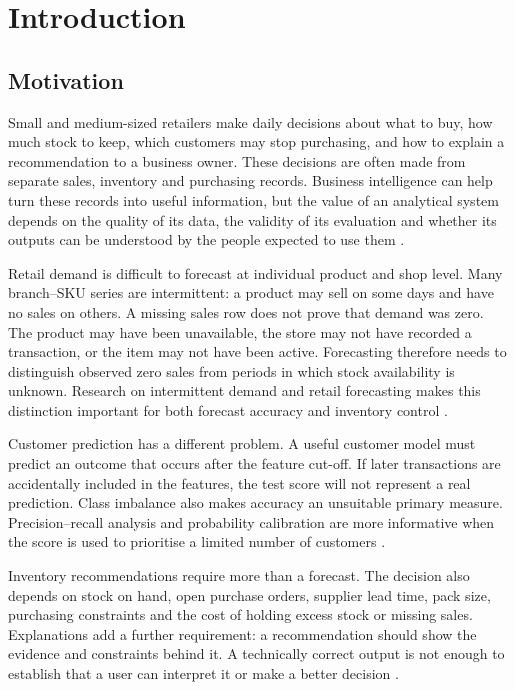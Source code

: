 \chapter{Introduction}
\label{chapter_introduction}

\section{Motivation}
Small and medium-sized retailers make daily decisions about what to buy, how much stock to keep, which customers may stop purchasing, and how to explain a recommendation to a business owner. These decisions are often made from separate sales, inventory and purchasing records. Business intelligence can help turn these records into useful information, but the value of an analytical system depends on the quality of its data, the validity of its evaluation and whether its outputs can be understood by the people expected to use them \citep{chen2012business,hoque2016ict,shahadat2023digital}.

Retail demand is difficult to forecast at individual product and shop level. Many branch--SKU series are intermittent: a product may sell on some days and have no sales on others. A missing sales row does not prove that demand was zero. The product may have been unavailable, the store may not have recorded a transaction, or the item may not have been active. Forecasting therefore needs to distinguish observed zero sales from periods in which stock availability is unknown. Research on intermittent demand and retail forecasting makes this distinction important for both forecast accuracy and inventory control \citep{croston1972intermittent,syntetos2005intermittent,fildes2022retail}.

Customer prediction has a different problem. A useful customer model must predict an outcome that occurs after the feature cut-off. If later transactions are accidentally included in the features, the test score will not represent a real prediction. Class imbalance also makes accuracy an unsuitable primary measure. Precision--recall analysis and probability calibration are more informative when the score is used to prioritise a limited number of customers \citep{saito2015pr,niculescu2005calibration}.

Inventory recommendations require more than a forecast. The decision also depends on stock on hand, open purchase orders, supplier lead time, pack size, purchasing constraints and the cost of holding excess stock or missing sales. Explanations add a further requirement: a recommendation should show the evidence and constraints behind it. A technically correct output is not enough to establish that a user can interpret it or make a better decision \citep{bertsimas2020prescriptive,miller2019explanation}.

